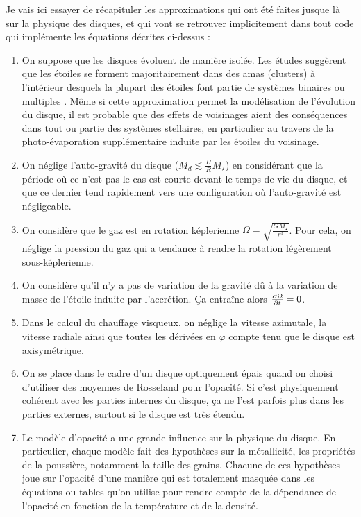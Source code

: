 Je vais ici essayer de récapituler les approximations qui ont été faites jusque là sur la physique des disques, et qui vont se retrouver implicitement dans tout code qui implémente les équations décrites ci-dessus : 
\begin{enumerate}
\item On suppose que les disques évoluent de manière isolée. Les études suggèrent que les étoiles se forment majoritairement dans des amas (clusters) à l'intérieur desquels la plupart des étoiles font partie de systèmes binaires ou multiples \citep{duquennoy1991multiplicity}. Même si cette approximation permet la modélisation de l'évolution du disque, il est probable que des effets de voisinages aient des conséquences dans tout ou partie des systèmes stellaires, en particulier au travers de la photo-évaporation supplémentaire induite par les étoiles du voisinage.
\item On néglige l'auto-gravité du disque ($M_d \lesssim \frac{H}{R}M_\star$) en considérant que la période où ce n'est pas le cas est courte devant le temps de vie du disque, et que ce dernier tend rapidement vers une configuration où l'auto-gravité est négligeable.
\item On considère que le gaz est en rotation képlerienne $\Omega=\sqrt{\frac{GM_\star}{r^3}}$. Pour cela, on néglige la pression du gaz qui a tendance à rendre la rotation légèrement sous-képlerienne.
\item On considère qu'il n'y a pas de variation de la gravité dû à la variation de masse de l'étoile induite par l'accrétion. Ça entraîne alors $\pd{\Omega}{t} = 0$.
\item Dans le calcul du chauffage visqueux, on néglige la vitesse azimutale, la vitesse radiale ainsi que toutes les dérivées en $\varphi$ compte tenu que le disque est axisymétrique.
\item On se place dans le cadre d'un disque optiquement épais quand on choisi d'utiliser des moyennes de Rosseland pour l'opacité. Si c'est physiquement cohérent avec les parties internes du disque, ça ne l'est parfois plus dans les parties externes, surtout si le disque est très étendu.
\item Le modèle d'opacité a une grande influence sur la physique du disque. En particulier, chaque modèle fait des hypothèses sur la métallicité, les propriétés de la poussière, notamment la taille des grains. Chacune de ces hypothèses joue sur l'opacité d'une manière qui est totalement masquée dans les équations ou tables qu'on utilise pour rendre compte de la dépendance de l'opacité en fonction de la température et de la densité.

\end{enumerate}
